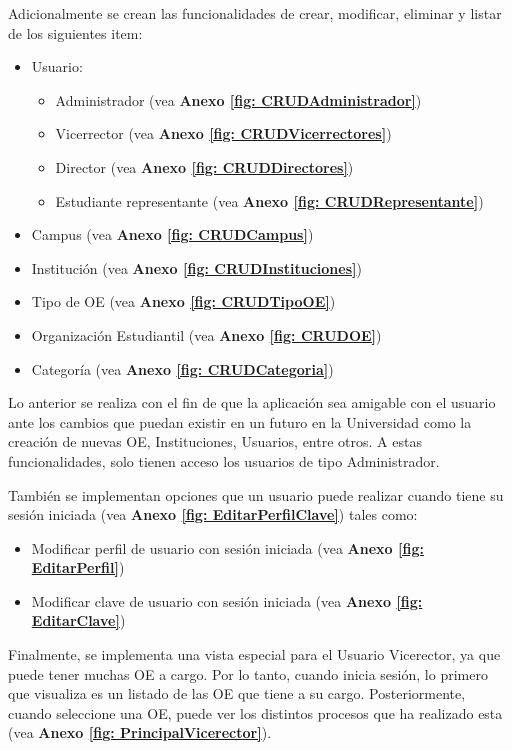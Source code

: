 Adicionalmente se crean las funcionalidades de crear, modificar, eliminar y listar de los siguientes item:
\begin{itemize}
    \item Usuario:
    \begin{itemize}
        \item Administrador (vea \textbf{Anexo \ref{fig: CRUDAdministrador}})
        \item Vicerrector (vea \textbf{Anexo \ref{fig: CRUDVicerrectores}})
        \item Director (vea \textbf{Anexo \ref{fig: CRUDDirectores}})
        \item Estudiante representante (vea \textbf{Anexo \ref{fig: CRUDRepresentante}})
    \end{itemize}
    \item Campus (vea \textbf{Anexo \ref{fig: CRUDCampus}})    
    \item Institución (vea \textbf{Anexo \ref{fig: CRUDInstituciones}})    
    \item Tipo de OE (vea \textbf{Anexo \ref{fig: CRUDTipoOE}})
    \item Organización Estudiantil (vea \textbf{Anexo \ref{fig: CRUDOE}})
    \item Categoría (vea \textbf{Anexo \ref{fig: CRUDCategoria}})      
\end{itemize}

Lo anterior se realiza con el fin de que la aplicación sea amigable con el usuario ante los cambios que puedan existir en un futuro en la Universidad como la creación de nuevas OE, Instituciones, Usuarios, entre otros. A estas funcionalidades, solo tienen acceso los usuarios de tipo Administrador.

También se implementan opciones que un usuario puede realizar cuando tiene su sesión iniciada (vea \textbf{Anexo \ref{fig: EditarPerfilClave}}) tales como:
  
\begin{itemize}
    \item Modificar perfil de usuario con sesión iniciada (vea \textbf{Anexo \ref{fig: EditarPerfil}})   
    \item Modificar clave de usuario con sesión iniciada (vea \textbf{Anexo \ref{fig: EditarClave}})  
\end{itemize}

Finalmente, se implementa una vista especial para el Usuario Vicerector, ya que puede tener muchas OE a cargo. Por lo tanto, cuando inicia sesión, lo primero que visualiza es un listado de las OE que tiene a su cargo. Posteriormente, cuando seleccione una OE, puede ver los distintos procesos que ha realizado esta (vea \textbf{Anexo \ref{fig: PrincipalVicerector}}).

